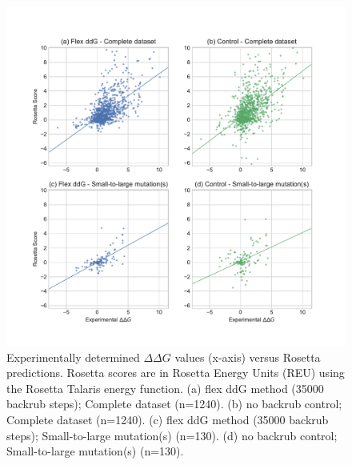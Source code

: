 \begin{figure}
  \includegraphics[width=\textwidth,keepaspectratio]{fig-scatter.pdf}
  \caption[]{ %
    Experimentally determined $\Delta\Delta G$ values (x-axis) versus Rosetta predictions.
    Rosetta scores are in Rosetta Energy Units (REU) using the Rosetta Talaris energy function\cite{song_structure-guided_2011,shapovalov_smoothed_2011,omeara_combined_2015}.
    (a) flex ddG method (35000 backrub steps); Complete dataset (n=1240).
    (b) no backrub control; Complete dataset (n=1240).
    (c) flex ddG method (35000 backrub steps); Small-to-large mutation(s) (n=130).
    (d) no backrub control; Small-to-large mutation(s) (n=130).
  } \label{fig:figure-scatter}
\end{figure}
